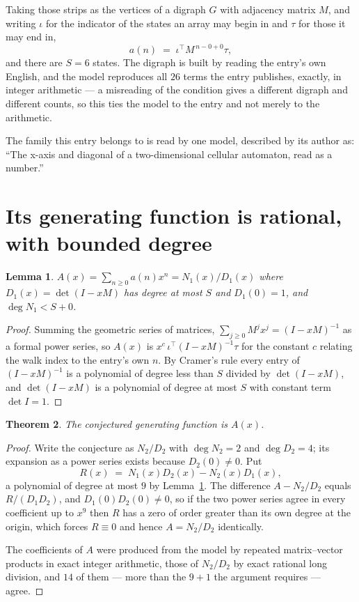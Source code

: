 \documentclass[11pt,a4paper]{article}
\theoremstyle{plain}
\newtheorem{theorem}{Theorem}
\newtheorem{lemma}[theorem]{Lemma}
\theoremstyle{definition}
\begin{document}
Taking those strips as the vertices of a digraph $G$ with adjacency matrix $M$, and writing
$\iota$ for the indicator of the states an array may begin in and $\tau$ for those it may end
in,
\[
a(n)\;=\;\iota^{\!\top}M^{\,n-0+0}\tau ,
\]
and there are $S=6$ states. The digraph is built by reading the entry's own English, and the
model reproduces all $26$ terms the entry publishes, exactly, in integer arithmetic --- a
misreading of the condition gives a different digraph and different counts, so this ties the
model to the entry and not merely to the arithmetic.

The family this entry belongs to is read by one model, described by its author as: ``The x-axis and diagonal of a two-dimensional cellular automaton, read as a number.''


\section{Its generating function is rational, with bounded degree}

\begin{lemma}\label{lem:rat}
$A(x)=\sum_{n\ge0}a(n)x^n=N_1(x)/D_1(x)$ where $D_1(x)=\det(I-xM)$ has degree at most
$S$ and $D_1(0)=1$, and $\deg N_1<S+0$.
\end{lemma}

\begin{proof}
Summing the geometric series of matrices, $\sum_{j\ge0}M^jx^j=(I-xM)^{-1}$ as a formal
power series, so $A(x)$ is $x^{c}\,\iota^{\!\top}(I-xM)^{-1}\tau$ for the constant $c$
relating the walk index to the entry's own $n$. By Cramer's rule every entry of
$(I-xM)^{-1}$ is a polynomial of degree less than $S$ divided by $\det(I-xM)$, and
$\det(I-xM)$ is a polynomial of degree at most $S$ with constant term $\det I=1$.
\end{proof}

\begin{theorem}
The conjectured generating function is $A(x)$.
\end{theorem}

\begin{proof}
Write the conjecture as $N_2/D_2$ with $\deg N_2=2$ and $\deg D_2=4$; its expansion as a
power series exists because $D_2(0)\neq0$. Put
\[
R(x)\;=\;N_1(x)D_2(x)-N_2(x)D_1(x),
\]
a polynomial of degree at most $9$ by Lemma~\ref{lem:rat}. The difference
$A-N_2/D_2$ equals $R/(D_1D_2)$, and $D_1(0)D_2(0)\neq0$, so if the two power series agree in
every coefficient up to $x^{9}$ then $R$ has a zero of order greater than its own
degree at the origin, which forces $R\equiv0$ and hence $A=N_2/D_2$ identically.

The coefficients of $A$ were produced from the model by repeated matrix--vector products in
exact integer arithmetic, those of $N_2/D_2$ by exact rational long division, and $14$
of them --- more than the $9+1$ the argument requires --- agree.
\end{proof}
\end{document}
